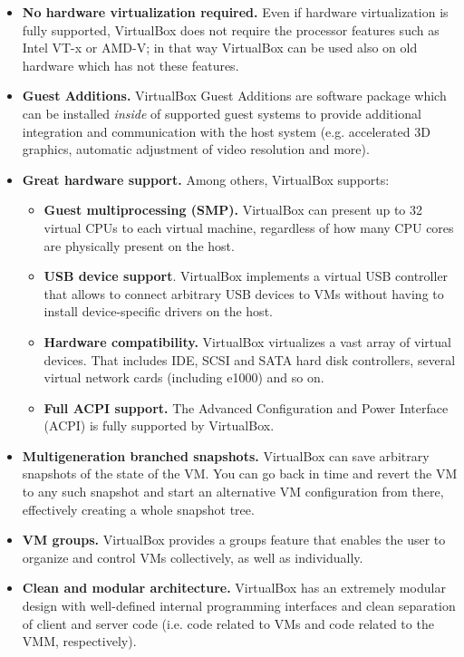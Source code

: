 \documentclass[a4paper, 12pt, titlepage]{report}
\begin{document}
\begin{itemize}
\begin{itemize}
	\end{itemize}
\item \textbf{No hardware virtualization required.} Even if hardware virtualization is fully supported, VirtualBox does not require the processor features such as Intel VT-x or AMD-V; in that way VirtualBox can be used also on old hardware which has not these features.
\item \textbf{Guest Additions.} VirtualBox Guest Additions are software package which can be installed \textit{inside} of supported guest systems to provide additional integration and communication with the host system (e.g. accelerated 3D graphics, automatic adjustment of video resolution and more).
\item \textbf{Great hardware support.} Among others, VirtualBox supports:
	\begin{itemize}
	\item \textbf{Guest multiprocessing (SMP).} VirtualBox can present up to 32 virtual CPUs to each virtual machine, regardless of how many CPU cores are physically present on the host.
	\item \textbf{USB device support}. VirtualBox implements a virtual USB controller that allows to connect arbitrary USB devices to VMs without having to install device-specific drivers on the host.
	\item \textbf{Hardware compatibility.} VirtualBox virtualizes a vast array of virtual devices. That includes IDE, SCSI and SATA hard disk controllers, several virtual network cards (including e1000) and so on.
	\item \textbf{Full ACPI support.} The Advanced Configuration and Power Interface (ACPI) is fully supported by VirtualBox.
	\end{itemize}
\item \textbf{Multigeneration branched snapshots.} VirtualBox can save arbitrary snapshots of the state of the VM. You can go back in time and revert the VM to any such snapshot and start an alternative VM configuration from there, effectively creating a whole snapshot tree.
\item \textbf{VM groups.} VirtualBox provides a groups feature that enables the user to organize and control VMs collectively, as well as individually.
\item \textbf{Clean and modular architecture.} VirtualBox has an extremely modular design with well-defined internal programming interfaces and clean separation of client and server code (i.e. code related to VMs and code related to the VMM, respectively).
\end{itemize}
\end{document}
